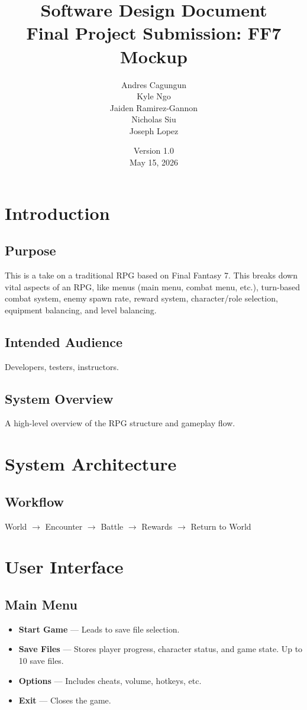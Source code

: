 \documentclass[12pt]{article}
\title{Software Design Document \\ \large Final Project Submission: FF7 Mockup}
\author{Andres Cagungun \\ Kyle Ngo \\ Jaiden Ramirez-Gannon \\ Nicholas Siu \\ Joseph Lopez}
\date{Version 1.0 \\ May 15, 2026}
\begin{document}
\maketitle
\tableofcontents
\newpage

\section{Introduction}

\subsection{Purpose}
This is a take on a traditional RPG based on Final Fantasy 7. This breaks down vital aspects of an RPG, like menus (main menu, combat menu, etc.), turn-based combat system, enemy spawn rate, reward system, character/role selection, equipment balancing, and level balancing.

\subsection{Intended Audience}
Developers, testers, instructors.

\subsection{System Overview}
A high-level overview of the RPG structure and gameplay flow.

\section{System Architecture}

\subsection{Workflow}
World $\rightarrow$ Encounter $\rightarrow$ Battle $\rightarrow$ Rewards $\rightarrow$ Return to World

\section{User Interface}

\subsection{Main Menu}
\begin{itemize}
    \item \textbf{Start Game} — Leads to save file selection.
    \item \textbf{Save Files} — Stores player progress, character status, and game state. Up to 10 save files.
    \item \textbf{Options} — Includes cheats, volume, hotkeys, etc.
    \item \textbf{Exit} — Closes the game.
\end{itemize}
\end{document}
